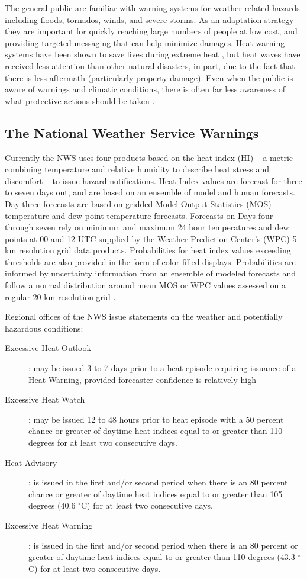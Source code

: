 \documentclass{ametsoc}
\begin{document}
The general public are familiar with warning systems for weather-related hazards including floods, tornados, winds, and severe storms. As an adaptation strategy they are important for quickly reaching large numbers of people at low cost, and providing targeted messaging that can help minimize damages. Heat warning systems have been shown to save lives during extreme heat \citep{Ebi2004}, but heat waves have received less attention than other natural disasters, in part, due to the fact that there is less aftermath (particularly property damage). Even when the public is aware of warnings and climatic conditions, there is often far less awareness of what protective actions should be taken \citep{Sheridan2007}.  

\subsection{The National Weather Service Warnings}\label{subsec:NWSWarnings}
Currently the NWS uses four products based on the heat index (HI) -- a metric combining temperature and relative humidity to describe heat stress and discomfort -- to issue hazard notifications. Heat Index values are forecast for three to seven days out, and are based on an ensemble of model and human forecasts. Day three forecasts are based on gridded Model Output Statistics (MOS) temperature and dew point temperature forecasts. Forecasts on Days four through seven rely on minimum and maximum 24 hour temperatures and dew points at 00 and 12 UTC supplied by the Weather Prediction Center's (WPC) 5-km resolution grid data products. Probabilities for heat index values exceeding thresholds are also provided in the form of color filled displays.  Probabilities are informed by uncertainty information from an ensemble of modeled forecasts and follow a normal distribution around mean MOS or WPC values assessed on a regular 20-km resolution grid \citep{NWSsite}. 


Regional offices of the NWS issue statements on the weather and potentially hazardous conditions: 

\begin{description} 
\item[Excessive Heat Outlook]: may be issued 3 to 7 days prior to a heat episode requiring issuance of a Heat Warning, provided forecaster confidence is relatively high 
\item[Excessive Heat Watch]: may be issued 12 to 48 hours prior to heat episode with a 50 percent chance or greater of daytime heat indices equal to or greater than 110 degrees for at least two consecutive days. 
\item[Heat Advisory]: is issued in the first and/or second period when there is an 80 percent chance or greater of daytime heat indices equal to or greater than 105 degrees (40.6 $^{\circ}$C) for at least two consecutive days. 
\item[Excessive Heat Warning]: is issued in the first and/or second period when there is an 80 percent or greater of daytime heat indices equal to or greater than 110 degrees (43.3 $^{\circ}$C) for at least two consecutive days. 
\end{description}
\end{document}
